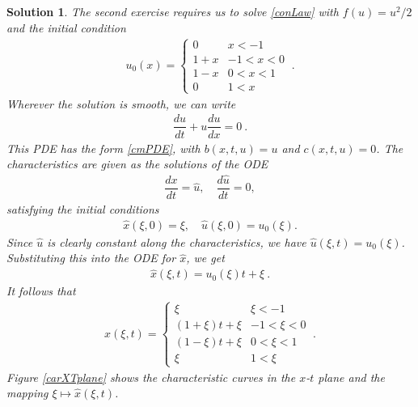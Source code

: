 \documentclass[10pt,letterpaper]{article}
\newcommand{\rb}[1]{ \left(  {#1} \right) }
\newcommand{\frb}[1]{ \left(  {#1} \right) }
\theoremstyle{break}
\newtheorem{mysolution}{Solution}
\newtheorem*{mysolutioninformation}{Solution Information}
\newenvironment{solution}{\begin{mysolution}}{\end{mysolution}} \newenvironment{solutioninformation}{\begin{mysolutioninformation}}{\end{mysolutioninformation}}
\begin{document}
\begin{solution}
	The second exercise requires us to solve \eqref{conLaw} with $f(u)=u^2/2$ and the initial condition
	\begin{gather}
		u_0(x)=\begin{cases}
				0 	& 	  x<-1\\
				1+x  	& -1 < x<0\\
				1-x 	&  0 < x<1\\
				0 	&  1 < x
			\end{cases}\ .
	\end{gather}
	Wherever the solution is smooth, we can write
	\begin{gather}
		\dfrac{du}{dt}+u\dfrac{du}{dx}=0\ .
	\end{gather}
	This PDE has the form \eqref{cmPDE}, with $b(x,t,u) = u$ and $c(x,t,u) = 0$.
	The characteristics are given as the solutions of the ODE
	\begin{gather}
		\dfrac{dx}{dt} =\hat u, 
		\quad
		\dfrac{d\hat u}{dt} = 0,
	\end{gather}
	satisfying the initial conditions
	\begin{gather}
		\hat x\frb{\xi,0} = \xi,
		\quad
		\hat u\frb{\xi,0} =u_0\frb{\xi}.
	\end{gather}
	Since $\hat u$ is clearly constant along the characteristics, we have $\hat u\frb{\xi,t}=u_0\frb{\xi}$.
	Substituting this into the ODE for $\hat x$, we get
	\begin{gather}
		\hat x\frb{\xi,t}=u_0\frb{\xi}t+\xi \ .
	\end{gather}
	It follows that
	\begin{gather}
		\hat x\frb{\xi,t}=\begin{cases}
				\xi 	& 	  \xi<-1\\
				\rb{1+\xi}t+\xi  	& -1 < \xi<0\\
				\rb{1-\xi}t+\xi 	&  0 < \xi<1\\
				\xi 	&  1 < \xi
			\end{cases}\ .
	\end{gather}
	Figure \ref{carXTplane} shows the characteristic curves in the $x$-$t$ plane and the mapping $\xi\mapsto \hat x\frb{\xi,t}$.
	

\end{solution}
\end{document}
